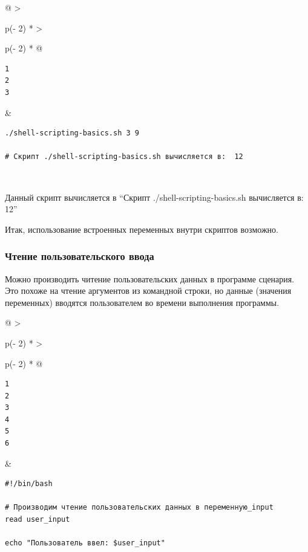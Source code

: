 \documentclass{article}
\begin{document}
\begin{longtable}[]{@{}
  >{\raggedright\arraybackslash}p{(\columnwidth - 2\tabcolsep) * }
  >{\raggedright\arraybackslash}p{(\columnwidth - 2\tabcolsep) * }@{}}
\toprule
\endhead
\begin{minipage}[t]{\linewidth}\raggedright
\begin{verbatim}
1
2
3
\end{verbatim}
\end{minipage} & \begin{minipage}[t]{\linewidth}\raggedright
\begin{verbatim}
./shell-scripting-basics.sh 3 9

# Скрипт ./shell-scripting-basics.sh вычисляется в:  12
\end{verbatim}
\end{minipage} \\ \addlinespace
\bottomrule
\end{longtable}

Данный скрипт вычисляется в ``Скрипт ./shell-scripting-basics.sh
вычисляется в: 12''

Итак, использование встроенных переменных внутри скриптов возможно.

\hypertarget{Reading-user-input}{%
\subsubsection{\texorpdfstring{\protect\hyperlink{Reading-user-input}{}Чтение
пользовательского
ввода}{Чтение пользовательского ввода}}\label{Reading-user-input}}

Можно производить читение пользовательских данных в программе сценария.
Это похоже на чтение аргументов из командной строки, но данные (значения
переменных) вводятся пользователем во времени выполнения программы.

\begin{longtable}[]{@{}
  >{\raggedright\arraybackslash}p{(\columnwidth - 2\tabcolsep) * }
  >{\raggedright\arraybackslash}p{(\columnwidth - 2\tabcolsep) * }@{}}
\toprule
\endhead
\begin{minipage}[t]{\linewidth}\raggedright
\begin{verbatim}
1
2
3
4
5
6
\end{verbatim}
\end{minipage} & \begin{minipage}[t]{\linewidth}\raggedright
\begin{verbatim}
#!/bin/bash

# Производим чтение пользовательских данных в переменную_input
read user_input

echo "Пользователь ввел: $user_input"
\end{verbatim}
\end{minipage} \\ \addlinespace
\bottomrule
\end{longtable}
\end{document}
